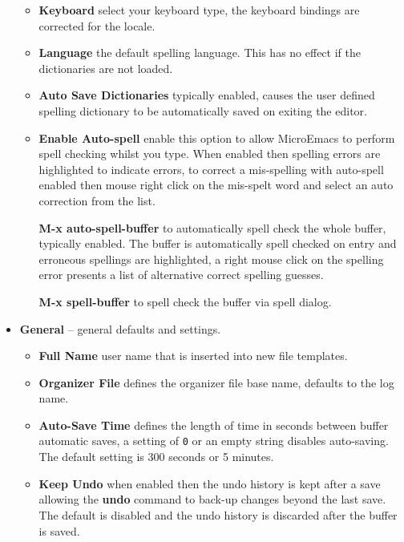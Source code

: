 \documentclass[11pt,a4paper,pdftex]{article}
\begin{document}
\begin{itemize}
\begin{itemize}
      \item \textbf{Keyboard} select your keyboard type, the keyboard bindings
      are corrected for the locale.

      \item \textbf{Language} the default spelling language. This has no
      effect if the dictionaries are not loaded. 

      \item \textbf{Auto Save Dictionaries} typically enabled, causes the user
      defined spelling dictionary to be automatically saved on exiting the
      editor.

      \item \textbf{Enable Auto-spell} enable this option to allow MicroEmacs
      to perform spell checking whilst you type. When enabled then spelling
      errors are highlighted to indicate errors, to correct a mis-spelling
      with auto-spell enabled then mouse right click on the mis-spelt word and
      select an auto correction from the list.

      \textbf{M-x auto-spell-buffer} to automatically spell check the whole
      buffer, typically enabled. The buffer is automatically spell checked on
      entry and erroneous spellings are highlighted, a right mouse click on
      the spelling error presents a list of alternative correct spelling
      guesses.

      \textbf{M-x spell-buffer} to spell check the buffer via spell dialog.

    \end{itemize}

    \item \textbf{General} -- general defaults and settings.

    \begin{itemize}

      \item \textbf{Full Name} user name that is inserted into new file
      templates.

      \item \textbf{Organizer File} defines the organizer file base name,
      defaults to the log name.

      \item \textbf{Auto-Save Time} defines the length of time in seconds
      between buffer automatic saves, a setting of \texttt{0} or an empty
      string disables auto-saving. The default setting is 300 seconds or 5
      minutes. 

      \item \textbf{Keep Undo} when enabled then the undo history is kept
      after a save allowing the \textbf{undo} command to back-up changes
      beyond the last save. The default is disabled and the undo history is
      discarded after the buffer is saved. 


\end{itemize}
\end{itemize}
\end{document}
